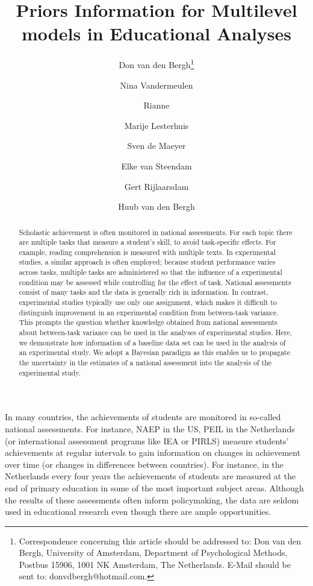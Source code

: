 \documentclass[a4paper]{article}
\author[1]{Don van den Bergh\thanks{Correspondence concerning this article should be addressed to:  
Don van den Bergh, University of Amsterdam, Department of Psychological Methods, Postbus 15906, 1001 NK Amsterdam, The Netherlands. E-Mail should be sent to: donvdbergh@hotmail.com.}}
\author[2]{Nina Vandermeulen}
\author[2]{Rianne}
\author[2]{Marije Lesterhuis}
\author[2]{Sven de Maeyer}
\author[2]{Elke van Steendam}
\author[2]{Gert Rijlaarsdam}
\author[3]{Huub van den Bergh}
\affil[1]{University of Amsterdam}
\affil[2]{University of Antwerp}
\affil[3]{University of Utrecht}
\title{Priors Information for Multilevel models in Educational Analyses}
\date{}
\renewcommand{\thefootnote}{\fnsymbol{footnote}}
\begin{document}
\listoftodos
\newpage
\maketitle
\renewcommand{\thefootnote}{\arabic{footnote}}

\begin{abstract}
    Scholastic achievement is often monitored in national assessments. For each topic there are multiple tasks that measure a student's skill, to avoid task-specific effects. For example, reading comprehension is measured with multiple texts. In experimental studies, a similar approach is often employed; because student performance varies across tasks, multiple tasks are administered so that the influence of a experimental condition may be assessed while controlling for the effect of task. National assessments consist of many tasks and the data is generally rich in information. In contrast, experimental studies typically use only one assignment, which makes it difficult to distinguish improvement in an experimental condition from between-task variance. This prompts the question whether knowledge obtained from national assessments about between-task variance can be used in the analyses of experimental studies. Here, we demonstrate how information of a baseline data set can be used in the analysis of an experimental study. We adopt a Bayesian paradigm as this enables us to propagate the uncertainty in the estimates of a national assessment into the analysis of the experimental study.
\end{abstract}
\newpage


In many countries, the achievements of students are monitored in so-called national assessments. For instance, NAEP in the US, PEIL in the Netherlands (or international assessment programs like IEA or PIRLS) measure students' achievements at regular intervals to gain information on changes in achievement over time (or changes in differences between countries). For instance, in the Netherlands every four years the achievements of students are measured at the end of primary education in some of the most important subject areas. Although the results of these assessments often inform policymaking, the data are seldom used in educational research even though there are ample opportunities.
\end{document}
